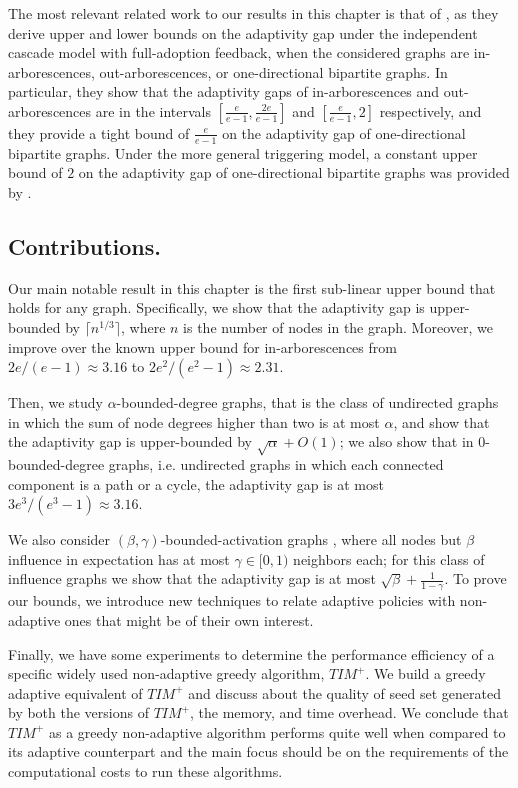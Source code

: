 The most relevant related work to our results in this chapter is that of \citet{Chen2019}, as they derive upper and lower bounds on the adaptivity gap under the independent cascade model with full-adoption feedback, when the considered graphs are in-arborescences, out-arborescences, or one-directional bipartite graphs. In particular, they show that the adaptivity gaps of in-arborescences and out-arborescences are in the intervals $\left[ \frac{e}{e-1}, \frac{2e}{e-1}\right]$ and $\left[ \frac{e}{e-1}, 2\right]$ respectively, and they provide a tight bound of $\frac{e}{e-1}$ on the adaptivity gap of one-directional bipartite graphs. Under the more general triggering model, a constant upper bound of $2$ on the adaptivity gap of one-directional bipartite graphs was provided by \citet{Fujii2019}.


\subsection*{Contributions.}
Our main notable result in this chapter is the first sub-linear upper bound that holds for any graph. Specifically, we show that the adaptivity gap is upper-bounded by $\lceil n^{1/3}\rceil$, where $n$ is the number of nodes in the graph. Moreover, we improve over the known upper bound for in-arborescences from $2e/(e-1)\approx 3.16$ to $2e^2/(e^2-1)\approx 2.31$. 

Then, we study $\alpha$-bounded-degree graphs, that is the class of undirected graphs in which the sum of node degrees higher than two is at most $\alpha$, and show that the adaptivity gap is upper-bounded by $\sqrt{\alpha}+O(1)$; we also show that in 0-bounded-degree graphs, i.e. undirected graphs in which each connected component is a path or a cycle, the adaptivity gap is at most $3e^3/(e^3-1)\approx 3.16$. 

We also consider $(\beta,\gamma)$-bounded-activation graphs \cite{AIJ}, where all nodes but $\beta$ influence in expectation has at most $\gamma\in [0,1)$ neighbors each; for this class of influence graphs we show that the adaptivity gap is at most $\sqrt{\beta}+\frac{1}{1-\gamma}$. To prove our bounds, we introduce new techniques to relate adaptive policies with non-adaptive ones that might be of their own interest. 


Finally, we have some experiments to determine the performance efficiency of a specific widely used non-adaptive greedy algorithm, $TIM^+$. We build a greedy adaptive equivalent of $TIM^+$ and discuss about the quality of seed set generated by both the versions of $TIM^+$, the memory, and time overhead. We conclude that $TIM^+$ as a greedy non-adaptive algorithm performs quite well when compared to its adaptive counterpart and the main focus should be on the requirements of the computational costs to run these algorithms.

